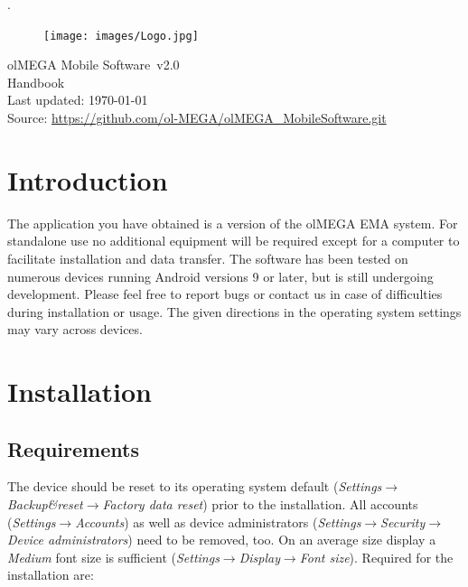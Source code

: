 \documentclass[11pt,a4paper,titlepage]{article}
\newcommand{\titleFull}{olMEGA Mobile Software}
\newcommand{\version}{v2.0}
\begin{document}
 
\pagestyle{empty}

\sffamily
\mdseries


\textcolor[rgb]{1,1,1}{.}
	\vspace{3cm}
	\begin{center}
	
	\begin{figure}[h]
		\centering
			\texttt{[image: images/Logo.jpg]}
	\end{figure}
	\vspace{3cm}
	\Huge
	\titleFull \ \version
	\normalsize
	\\
	\vspace{1cm}
	Handbook\\
	\vspace{1cm}
	Last updated: \today\\
	\vspace{1cm}
	Source: \url{https://github.com/ol-MEGA/olMEGA_MobileSoftware.git}
	\vfill
	\end{center}

%
\clearpage

\tableofcontents

\clearpage

\setcounter{page}{1}
\pagestyle{fancy}

\section{Introduction}

The application you have obtained is a version of the olMEGA EMA system. For standalone use no additional equipment will be required except for a computer to facilitate installation and data transfer. The software has been tested on numerous devices running Android versions 9 or later, but is still undergoing development. Please feel free to report bugs or contact us in case of difficulties during installation or usage. The given directions in the operating system settings may vary across devices.


\section{Installation}


\subsection{Requirements}

The device should be reset to its operating system default (\textit{Settings}$\rightarrow$\textit{Backup\&reset}$\rightarrow$\textit{Factory data reset}) prior to the installation. All accounts (\textit{Settings}$\rightarrow$\textit{Accounts}) as well as device administrators (\textit{Settings}$\rightarrow$\textit{Security}$\rightarrow$\textit{Device administrators}) need to be removed, too. On an average size display a \textit{Medium} font size is sufficient (\textit{Settings}$\rightarrow$\textit{Display}$\rightarrow$\textit{Font size}). Required for the installation are:
\end{document}
